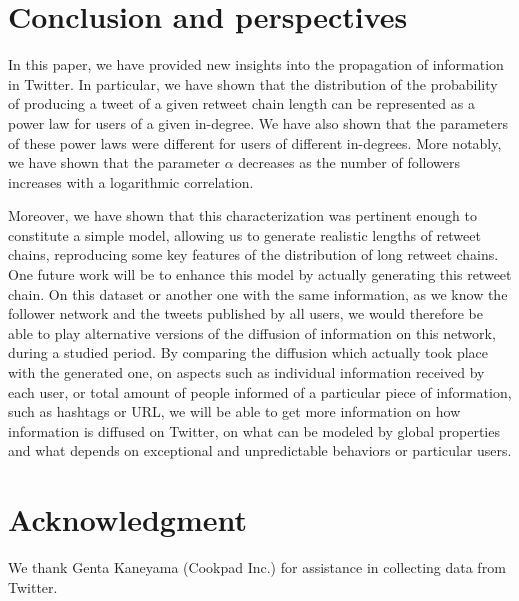 \documentclass[conference]{IEEEtran}
\begin{document}



\section{Conclusion and perspectives}
In this paper, we have provided new insights into the propagation of information in Twitter. In particular, we have shown that the distribution of the probability of producing a tweet of a given retweet chain length can be represented as a power law for users of a given in-degree. We have also shown that the parameters of these power laws were different for users of different in-degrees. More notably, we have shown that the parameter $\alpha$ decreases as the number of followers increases with a logarithmic correlation.

Moreover, we have shown that this characterization was pertinent enough to constitute a simple model, allowing us to generate realistic lengths of retweet chains, reproducing some key features of the distribution of long retweet chains. One future work will be to enhance this model by actually generating this retweet chain. On this dataset or another one with the same information, as we know the follower network and the tweets published by all users, we would therefore be able to play alternative versions of the diffusion of information on this network, during a studied period. By comparing the diffusion which actually took place with the generated one, on aspects such as individual information received by each user, or total amount of people informed of a particular piece of information, such as hashtags or URL, we will be able to get more information on how information is diffused on Twitter, on what can be modeled by global properties and what depends on exceptional and unpredictable behaviors or particular users.






\section*{Acknowledgment}
We thank Genta Kaneyama (Cookpad Inc.) for assistance in collecting data from Twitter.
\end{document}
